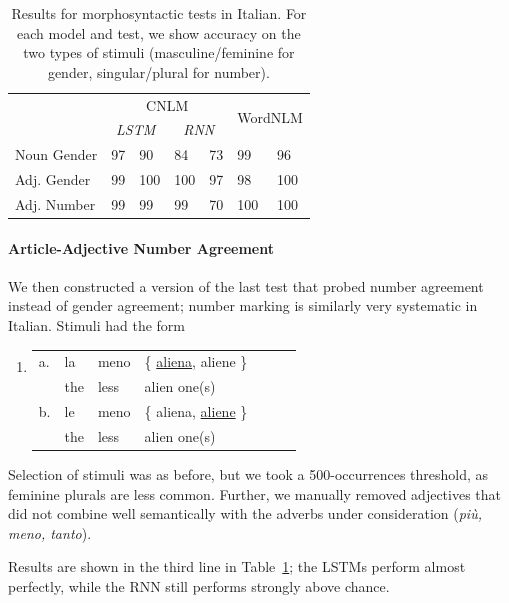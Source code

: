 \begin{table}[t]
  \begin{center}
    \begin{tabular}{l|ll|ll|ll}
	    & \multicolumn{4}{c|}{CNLM} & \multicolumn{2}{c}{\multirow{2}{*}{WordNLM}}\\
	    &\multicolumn{2}{c|}{\emph{LSTM}}&\multicolumn{2}{c|}{\emph{RNN}} &\\ \hline
	    Noun Gender & 97&90  & 84&73 & 99&96 \\
	    Adj. Gender & 99&100 & 100&97 & 98&100 \\
	    Adj. Number & 99&99 & 99&70 & 100&100 \\
    \end{tabular}
  \end{center}
	\caption{\label{tab:ital-agr-results} Results for morphosyntactic tests in Italian. For each model and test, we show accuracy on the two types of stimuli (masculine/feminine for gender, singular/plural for number).}
\end{table}

\paragraph{Article-Adjective Number Agreement}
We then constructed a version of the last test that probed number agreement instead of gender agreement; number marking is similarly very systematic in Italian.
Stimuli had the form
\begin{enumerate}[label={(\arabic*)}]
	\item 
\begin{tabular}[t]{lllllll}
	a. & la & meno & \{ \underline{aliena}, aliene \} \\
   &  the & less & alien one(s)  \\
	b. & le & meno & \{ aliena, \underline{aliene} \} \\
    &the & less & alien one(s) \\
\end{tabular}
\end{enumerate}
Selection of stimuli was  as before, but  we took a 500-occurrences threshold, as feminine plurals are less common.
Further, we manually removed adjectives that did not combine well semantically with the adverbs under consideration (\emph{pi{\`u}, meno, tanto}).

Results are shown in the third line in Table~\ref{tab:ital-agr-results}; the LSTMs perform almost perfectly, while the RNN still performs strongly above chance.






